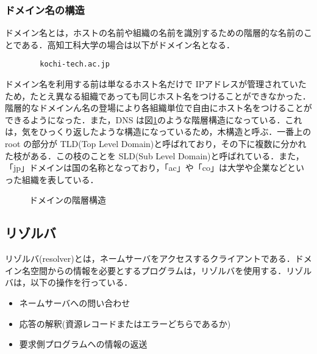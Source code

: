 \documentclass[a4j,titlepage]{jarticle}
\begin{document}
\subsubsection{ドメイン名の構造}
ドメイン名とは，ホストの名前や組織の名前を識別するための階層的な名前のことである．高知工科大学の場合は以下がドメイン名となる．

\begin{center}
  \begin{screen}
\begin{verbatim}
        kochi-tech.ac.jp
\end{verbatim}
\end{screen}
\end{center}

ドメイン名を利用する前は単なるホスト名だけで IPアドレスが管理されていたため，たとえ異なる組織であっても同じホスト名をつけることができなかった．階層的なドメインん名の登場により各組織単位で自由にホスト名をつけることができるようになった．また，DNS は図\ref{fig:dns}のような階層構造になっている．これは，気をひっくり返したような構造になっているため，木構造と呼ぶ．一番上の root の部分が TLD(Top Level Domain)と呼ばれており，その下に複数に分かれた枝がある．この枝のことを SLD(Sub Level Domain)と呼ばれている．また，「jp」ドメインは国の名称となっており，「ac」や「co」は大学や企業などといった組織を表している．

  \begin{figure}[htbp]
    \begin{center}
      \caption{ドメインの階層構造}
     \label{fig:dns}
   \end{center}
  \end{figure}

\subsection{リゾルバ\cite{bib:dnstext}}
リゾルバ(resolver)とは，ネームサーバをアクセスするクライアントである．ドメイン名空間からの情報を必要とするプログラムは，リゾルバを使用する．リゾルバは，以下の操作を行っている．

\begin{itemize}
\item ネームサーバへの問い合わせ
\item 応答の解釈(資源レコードまたはエラーどちらであるか)
\item 要求側プログラムへの情報の返送
\end{itemize}
\end{document}
